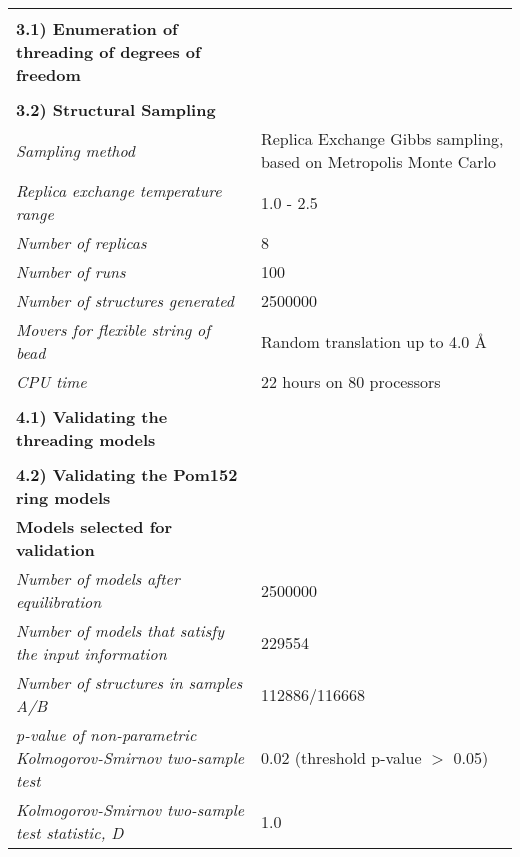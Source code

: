 \documentclass[8pt,a4paper]{article}
\begin{document}
\begin{longtable}{ p{} | p{} }
  &  \\
    \normalsize{\textbf{3.1) Enumeration of threading of degrees of freedom}} & \\
    \hline
      
   &  \\
    \normalsize{\textbf{3.2) Structural Sampling}} & \\
    \hline
            \textit{Sampling method} & Replica Exchange Gibbs sampling, based on Metropolis Monte Carlo\\
                \textit{Replica exchange temperature range} & 1.0 - 2.5\\
                \textit{Number of replicas} & 8\\
                \textit{Number of runs} & 100\\
                \textit{Number of structures generated} & 2500000\\
                \textit{Movers for flexible string of bead} & Random translation up to 4.0 \AA\\
                \textit{CPU time} & 22 hours on 80 processors\\
        
   &  \\
  
\normalsize{\textbf{4.1) Validating the threading models}} & \\
    \hline
  
 &  \\

  \normalsize{\textbf{4.2) Validating the Pom152 ring models}} & \\
    \hline
   \textbf{Models selected for validation} & \\
    \hline
          \textit{Number of models after equilibration} & 2500000\\
                \textit{Number of models that satisfy the input information} & 229554\\
                \textit{Number of structures in samples A/B} & 112886/116668\\
                \textit{p-value of non-parametric Kolmogorov-Smirnov two-sample test} & 0.02 (threshold p-value $>$ 0.05)\\
                \textit{Kolmogorov-Smirnov two-sample test statistic, D} & 1.0\\
           \hline
    

\end{longtable}
\end{document}
